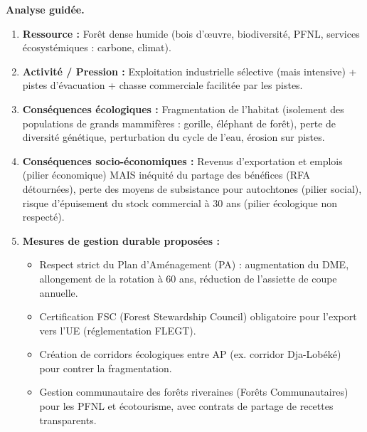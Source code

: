 \documentclass[11pt]{article}
\newcommand{\cle}[1]{{\popxbold\color{popdark}#1}}
\begin{document}
\begin{experience}
\textbf{Analyse guidée.}
\begin{enumerate}
    \item \textbf{Ressource :} Forêt dense humide (bois d'œuvre, biodiversité, PFNL, \cle{services écosystémiques} : carbone, climat).
    \item \textbf{Activité / Pression :} Exploitation industrielle sélective (mais intensive) + pistes d'évacuation + chasse commerciale facilitée par les pistes.
    \item \textbf{Conséquences écologiques :} Fragmentation de l'habitat (isolement des populations de grands mammifères : gorille, éléphant de forêt), perte de diversité génétique, perturbation du cycle de l'eau, érosion sur pistes.
    \item \textbf{Conséquences socio-économiques :} Revenus d'exportation et emplois (pilier économique) MAIS inéquité du partage des bénéfices (RFA détournées), perte des moyens de subsistance pour autochtones (pilier social), risque d'épuisement du stock commercial à 30 ans (pilier écologique non respecté).
    \item \textbf{Mesures de gestion durable proposées :}
    \begin{itemize}
        \item Respect strict du \cle{Plan d'Aménagement (PA)} : augmentation du DME, allongement de la rotation à 60 ans, réduction de l'\cle{assiette de coupe annuelle}.
        \item Certification \cle{FSC} (Forest Stewardship Council) obligatoire pour l'export vers l'UE (réglementation \cle{FLEGT}).
        \item Création de \cle{corridors écologiques} entre AP (ex. corridor Dja-Lobéké) pour contrer la fragmentation.
        \item \cle{Gestion communautaire} des forêts riveraines (Forêts Communautaires) pour les PFNL et écotourisme, avec contrats de partage de recettes transparents.
    \end{itemize}
\end{enumerate}
\end{experience}
\end{document}
